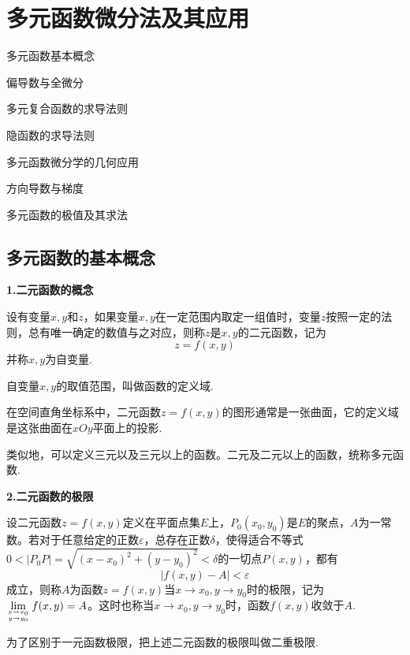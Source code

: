 \setcounter{chapter}{7}

\chapter{多元函数微分法及其应用}

\begin{introduction}
    \item 多元函数基本概念
    \item 偏导数与全微分
    \item 多元复合函数的求导法则
    \item 隐函数的求导法则
    \item 多元函数微分学的几何应用
    \item 方向导数与梯度
    \item 多元函数的极值及其求法
\end{introduction}

\section{多元函数的基本概念}
\textbf{1.二元函数的概念}

设有变量$x,y$和$z$，如果变量$x,y$在一定范围内取定一组值时，变量$z$按照一定的法则，总有唯一确定的数值与之对应，则称$z$是$x,y$的二元函数，记为
\begin{equation*}
    z=f(x,y)
\end{equation*}
并称$x,y$为自变量.

自变量$x,y$的取值范围，叫做函数的定义域.

在空间直角坐标系中，二元函数$z=f(x,y)$的图形通常是一张曲面，它的定义域是这张曲面在$xOy$平面上的投影.

类似地，可以定义三元以及三元以上的函数。二元及二元以上的函数，统称多元函数.

\textbf{2.二元函数的极限}

设二元函数$z=f(x,y)$定义在平面点集$E$上，$P_0(x_0,y_0)$是$E$的聚点，$A$为一常数。若对于任意给定的正数$\varepsilon$，总存在正数$\delta$，使得适合不等式$0<|P_0P|=\sqrt{(x-x_0)^2+(y-y_0)^2}<\delta$的一切点$P(x,y)$，都有
\begin{equation*}
    |f(x,y)-A|<\varepsilon
\end{equation*}
成立，则称$A$为函数$z=f(x,y)$当$x\rightarrow x_0, y\rightarrow y_0$时的极限，记为$\displaystyle \lim_{x\rightarrow x_0 \atop y\rightarrow y_0}f(x,y)=A$。这时也称当$x\rightarrow x_0, y\rightarrow y_0$时，函数$f(x,y)$收敛于$A$.

为了区别于一元函数极限，把上述二元函数的极限叫做二重极限.

